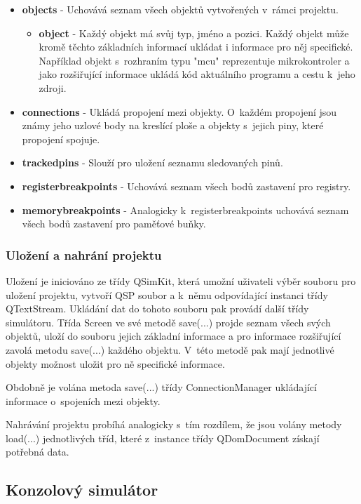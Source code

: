 \begin{itemize}
\item \textbf{objects} - Uchovává seznam všech objektů vytvořených v~rámci projektu.
\begin{itemize}
\item \textbf{object} - Každý objekt má svůj typ, jméno a pozici. Každý objekt může kromě těchto základních informací ukládat i informace pro něj specifické. Například objekt s~rozhraním typu "mcu" reprezentuje mikrokontroler a jako rozšiřující informace ukládá kód aktuálního programu a cestu k~jeho zdroji.
\end{itemize}
\item \textbf{connections} - Ukládá propojení mezi objekty. O~každém propojení jsou známy jeho uzlové body na kreslící ploše a objekty s~jejich piny, které propojení spojuje.
\item \textbf{trackedpins} - Slouží pro uložení seznamu sledovaných pinů.
\item \textbf{registerbreakpoints} - Uchovává seznam všech bodů zastavení pro registry. 
\item \textbf{memorybreakpoints} - Analogicky k~registerbreakpoints uchovává seznam všech bodů zastavení pro paměťové buňky.
\end{itemize}


\subsubsection{Uložení a nahrání projektu}

Uložení je iniciováno ze třídy QSimKit, která umožní uživateli výběr souboru pro uložení projektu, vytvoří QSP soubor a k~němu odpovídající instanci třídy QTextStream. Ukládání dat do tohoto souboru pak provádí další třídy simulátoru. Třída Screen ve své metodě save(...) projde seznam všech svých objektů, uloží do souboru jejich základní informace a pro informace rozšiřující zavolá metodu save(...) každého objektu. V~této metodě pak mají jednotlivé objekty možnost uložit pro ně specifické informace.

Obdobně je volána metoda save(...) třídy ConnectionManager ukládající informace o~spojeních mezi objekty.

Nahrávání projektu probíhá analogicky s~tím rozdílem, že jsou volány metody load(...) jednotlivých tříd, které z~instance třídy QDomDocument získají potřebná data.

\subsection{Konzolový simulátor}

